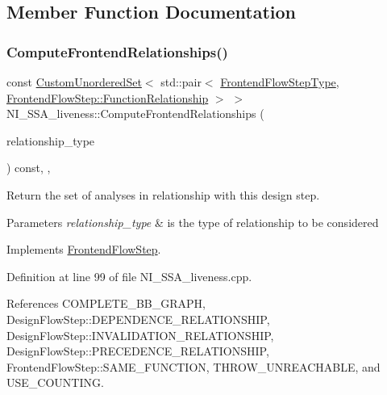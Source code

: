 \subsection{Member Function Documentation}
\mbox{\label{classNI__SSA__liveness_a1e1ba9a120adf8b7c47fb56e4798f653}} 
\subsubsection{\texorpdfstring{Compute\+Frontend\+Relationships()}{ComputeFrontendRelationships()}}
{\footnotesize\ttfamily const \hyperlink{classCustomUnorderedSet}{Custom\+Unordered\+Set}$<$ std\+::pair$<$ \hyperlink{frontend__flow__step_8hpp_afeb3716c693d2b2e4ed3e6d04c3b63bb}{Frontend\+Flow\+Step\+Type}, \hyperlink{classFrontendFlowStep_af7cf30f2023e5b99e637dc2058289ab0}{Frontend\+Flow\+Step\+::\+Function\+Relationship} $>$ $>$ N\+I\+\_\+\+S\+S\+A\+\_\+liveness\+::\+Compute\+Frontend\+Relationships (\begin{DoxyParamCaption}\item[{const \hyperlink{classDesignFlowStep_a723a3baf19ff2ceb77bc13e099d0b1b7}{Design\+Flow\+Step\+::\+Relationship\+Type}}]{relationship\+\_\+type }\end{DoxyParamCaption}) const\hspace{0.3cm}{\ttfamily [override]}, {\ttfamily [private]}, {\ttfamily [virtual]}}



Return the set of analyses in relationship with this design step. 


\begin{DoxyParams}{Parameters}
{\em relationship\+\_\+type} & is the type of relationship to be considered \\
\hline
\end{DoxyParams}


Implements \hyperlink{classFrontendFlowStep_abeaff70b59734e462d347ed343dd700d}{Frontend\+Flow\+Step}.



Definition at line 99 of file N\+I\+\_\+\+S\+S\+A\+\_\+liveness.\+cpp.



References C\+O\+M\+P\+L\+E\+T\+E\+\_\+\+B\+B\+\_\+\+G\+R\+A\+PH, Design\+Flow\+Step\+::\+D\+E\+P\+E\+N\+D\+E\+N\+C\+E\+\_\+\+R\+E\+L\+A\+T\+I\+O\+N\+S\+H\+IP, Design\+Flow\+Step\+::\+I\+N\+V\+A\+L\+I\+D\+A\+T\+I\+O\+N\+\_\+\+R\+E\+L\+A\+T\+I\+O\+N\+S\+H\+IP, Design\+Flow\+Step\+::\+P\+R\+E\+C\+E\+D\+E\+N\+C\+E\+\_\+\+R\+E\+L\+A\+T\+I\+O\+N\+S\+H\+IP, Frontend\+Flow\+Step\+::\+S\+A\+M\+E\+\_\+\+F\+U\+N\+C\+T\+I\+ON, T\+H\+R\+O\+W\+\_\+\+U\+N\+R\+E\+A\+C\+H\+A\+B\+LE, and U\+S\+E\+\_\+\+C\+O\+U\+N\+T\+I\+NG.

